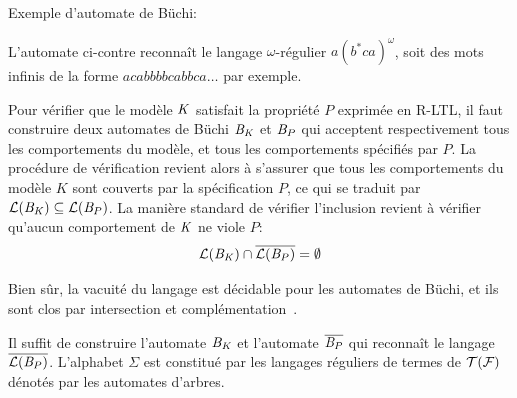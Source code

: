 \begin{example}
  Exemple d'automate de Büchi:\\

  \begin{center}
  \end{center}
  L'automate ci-contre reconnaît le langage $\omega$-régulier $a(b^*ca)^\omega$,
  soit des mots infinis de la forme $acabbbbcabbca\dots$ par exemple.
\end{example}



Pour vérifier que le modèle $\mathit K$ satisfait la propriété $P$ exprimée en R-LTL, 
il faut construire deux automates de Büchi $\mathit B_\mathit K$ et $\mathit B_P$ qui acceptent respectivement
tous les comportements du modèle, et tous les comportements spécifiés par $P$.
La procédure de vérification revient alors à s'assurer que tous les comportements du modèle
$K$ sont couverts par la spécification $P$, ce qui se traduit par $\mathcal{L}(\mathit B_\mathit K) \subseteq \mathcal{L}(\mathit B_P)$.
La manière standard de vérifier l'inclusion revient à vérifier qu'aucun comportement de
$\mathit K$ ne viole $P$:
\[ \mathcal{L}(\mathit B_\mathit K) \cap \overline{\mathcal{L}(\mathit B_P)} = \emptyset \]

Bien sûr, la vacuité du langage est décidable pour les automates de
Büchi, et ils sont clos par intersection et complémentation~\cite{Buchi}.

Il suffit de construire l'automate $\mathit B_\mathit K$ et l'automate $\overline{\mathit B_P}$ qui reconnaît le langage $\overline{\mathcal{L}(\mathit B_P)}$.
L'alphabet $\Sigma$ est constitué par les langages réguliers de termes de $\mathcal{T(F)}$ dénotés par les 
automates d'arbres.

